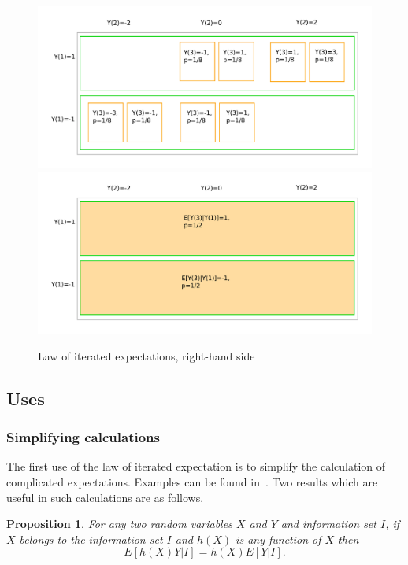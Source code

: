 \documentclass[12pt,reqno,openany]{amsbook}
\theoremstyle{plain}
\newtheorem{prop}{Proposition}[chapter]
\theoremstyle{definition}
\begin{document}
\begin{figure}
\includegraphics[width=\textwidth]{iter_expect/lier1.pdf}\\
\includegraphics[width=\textwidth]{iter_expect/lier2.pdf}
\caption{Law of iterated expectations, right-hand side}\label{fig:lie-rhs}
\end{figure}

\subsection{Uses}
\subsubsection{Simplifying calculations}
The first use of the law of iterated expectation is to simplify the
calculation of complicated expectations. Examples can be found
in~\cite{ross-probability}. Two results which are useful
in such calculations are as follows.

\begin{prop}\label{prop:conex-funx}
  For any two random variables $X$ and $Y$ and information set $I$, if
  $X$ belongs to the information set $I$ and $h(X)$ is any function of
  $X$ then
  \[E[h(X)Y|I]=h(X)E[Y|I].\]
\end{prop}
\end{document}
